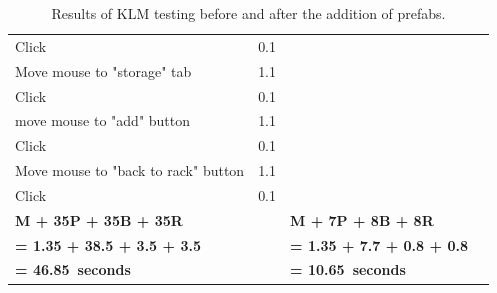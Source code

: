 \documentclass[11pt]{article}
\begin{document}
\begin{table}[h!]
{\begin{tabular}{lrlr}
					Click                                    & 0.1       &                                                 &     \\
					Move mouse to "storage" tab              & 1.1       &                                                 &     \\
					Click                                    & 0.1       &                                                 &     \\
					move mouse to "add" button               & 1.1       &                                                 &     \\
					Click                                    & 0.1       &                                                 &     \\
					Move mouse to "back to rack" button      & 1.1       &                                                 &     \\
					Click                                    & 0.1       &                                                 &     \\ \midrule
					\textbf{M + 35P + 35B + 35R}             &           & \textbf{M + 7P + 8B + 8R}                       &     \\
					\textbf{= 1.35 + 38.5 + 3.5 + 3.5}       & \textbf{} & \textbf{= 1.35 + 7.7 + 0.8 + 0.8}               &     \\
					\textbf{= 46.85~seconds}                         & \textbf{} & \textbf{= 10.65~seconds}                                &     \\ \bottomrule
				\end{tabular}%
				}
				\caption[Results of KLM testing before and after the addition of prefabs]{Results of KLM testing before and after the addition of prefabs.}
				\label{tab:results}
			\end{table}
\end{document}
